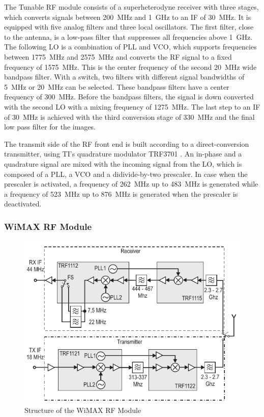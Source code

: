 The Tunable RF module consists of a superheterodyne receiver with three stages, which converts signals between \SI{200}{MHz} and \SI{1}{GHz} to an \ac{IF} of \SI{30}{MHz}. It is equipped with five analog filters and three local oscillators. The first filter, close to the antenna, is a low-pass filter that suppresses all frequencies above \SI{1}{GHz}. The following \ac{LO} is a combination of \ac{PLL} and \ac{VCO}, which supports frequencies between \SI{1775}{MHz} and \SI{2575}{MHz} and converts the RF signal to a fixed frequency of \SI{1575}{MHz}. This is the center frequency of the second \SI{20}{MHz} wide bandpass filter. With a switch, two filters with different signal bandwidths of \SI{5}{MHz} or \SI{20}{MHz} can be selected. These bandpass filters have a center frequency of \SI{300}{MHz}. Before the bandpass filters, the signal is down converted with the second \ac{LO} with a mixing frequency of \SI{1275}{MHz}. The last step to an \ac{IF} of \SI{30}{MHz} is achieved with the third conversion stage of \SI{330}{MHz} and the final low pass filter for the images.

The transmit side of the RF front end is built according to a direct-conversion transmitter, using TI's quadrature modulator TRF3701 \cite{trf3701}. An in-phase and a quadrature signal are mixed with the incoming signal from the \ac{LO}, which is composed of a \ac{PLL}, a \ac{VCO} and a didivide-by-two prescaler. In case when the prescaler is activated, a frequency of \SI{262}{MHz} up to \SI{483}{MHz} is generated while a frequency of \SI{523}{MHz} up to \SI{876}{MHz} is generated when the prescaler is deactivated.

\subsubsection{WiMAX RF Module}
\begin{figure}
	\centering
		\includegraphics[width=1.00\textwidth]{../kapitel03/figures/WiMax_RF_module.pdf}
	\caption{Structure of the WiMAX RF Module}
	\label{fig:WiMax_RF_module}
\end{figure}

